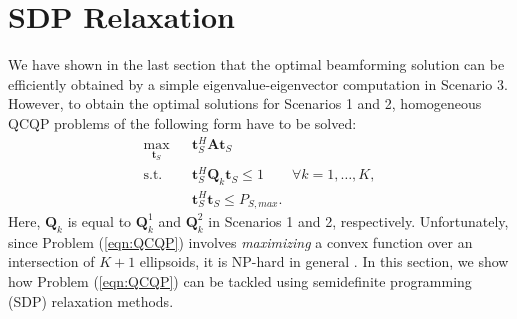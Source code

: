 \documentclass[twocolumn,10pt]{IEEEtran}
\theoremstyle{plain} \newtheorem{theorem}{Theorem}
\theoremstyle{plain} \newtheorem{proposition}{Proposition}
\theoremstyle{plain} \newtheorem{corollary}{Corollary}
\theoremstyle{remark} \newtheorem{remark}{Remark}
\theoremstyle{remark} \newtheorem{lemma}{Lemma}
\theoremstyle{plain} \newtheorem{definition}{Definition}
\theoremstyle{plain} \newtheorem{assumption}{Assumption}
\theoremstyle{plain} \newtheorem{fact}{Fact}
\begin{document}
\section{SDP Relaxation}\label{section:4}
We have shown in the last section that the optimal beamforming solution can be efficiently obtained by a simple eigenvalue-eigenvector computation in Scenario 3. However, to obtain the optimal solutions for Scenarios 1 and 2, homogeneous QCQP problems of the following form have to be solved:
\begin{subequations}\label{eqn:QCQP}
\begin{eqnarray}
\max_{\mathbf{t}_S} && \mathbf{t}_S^H\mathbf{A}\mathbf{t}_S \\
\text{s.t. } && \mathbf{t}_S^H\mathbf{Q}_k\mathbf{t}_S \leq 1 \qquad\forall k=1,\ldots,K, \label{sdp-constraint14b}\\
&&\mathbf{t}_S^H\mathbf{t}_S \leq P_{S,max}\label{sdp-constraint14c}.
\end{eqnarray}
\end{subequations}
Here, $\mathbf{Q}_k$ is equal to $\mathbf{Q}_k^1$ and $\mathbf{Q}_k^2$ in Scenarios 1 and 2, respectively.  Unfortunately, since Problem (\ref{eqn:QCQP}) involves \emph{maximizing} a convex function over an intersection of $K+1$ ellipsoids, it is NP-hard in general \cite{NRT99}.  In this section, we show how Problem (\ref{eqn:QCQP}) can be tackled using semidefinite programming (SDP) relaxation methods.
\end{document}
